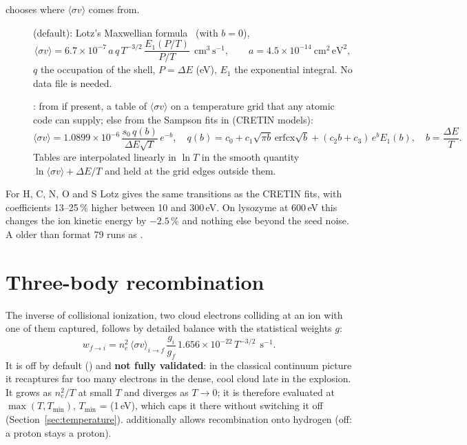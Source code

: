  chooses where $\langle\sigma v\rangle$ comes from.
\begin{description}
  \item[] (default): Lotz's Maxwellian formula~\cite{lotz1968} (with $b=0$),
    \begin{equation}
      \langle\sigma v\rangle = 6.7\times10^{-7}\,a\,q\,T^{-3/2}\,\frac{E_1(P/T)}{P/T}\ \ \mathrm{cm^3\,s^{-1}},\qquad
      a = 4.5\times10^{-14}\ \mathrm{cm^2\,eV^2},
    \end{equation}
    $q$ the occupation of the shell, $P = \Delta E$ (eV), $E_1$ the exponential integral.
    No data file is needed.
  \item[]: from  if present, a table of
    $\langle\sigma v\rangle$ on a temperature grid that any atomic code can supply; else from the Sampson fits in
     (CRETIN models):
    \begin{equation}
      \langle\sigma v\rangle = 1.0899\times10^{-6}\,\frac{s_0\,q(b)}{\Delta E\sqrt T}\,e^{-b},\quad
      q(b) = c_0 + c_1\sqrt{\pi b}\,\mathrm{erfcx}\sqrt b + (c_2b+c_3)\,e^bE_1(b),\quad b = \frac{\Delta E}{T}.
    \end{equation}
    Tables are interpolated linearly in $\ln T$ in the smooth quantity $\ln\langle\sigma v\rangle + \Delta E/T$ and
    held at the grid edges outside them.
\end{description}
For H, C, N, O and S Lotz gives the same transitions as the CRETIN fits, with coefficients 13--25\,\% higher
between 10 and 300\,eV.
On lysozyme at 600\,eV this changes the ion kinetic energy by $-2.5$\,\% and nothing else beyond the seed noise.
A  older than format 79 runs as .

\section{Three-body recombination}
\label{sec:recombination}

The inverse of collisional ionization, two cloud electrons colliding at an ion with one of them captured, follows by
detailed balance with the statistical weights $g$:
\begin{equation}
  w_{f\to i} = n_e^2\,\langle\sigma v\rangle_{i\to f}\,\frac{g_i}{g_f}\,1.656\times10^{-22}\,T^{-3/2}\ \ \mathrm{s^{-1}}.
\end{equation}
It is off by default () and \textbf{not fully validated}: in the classical
continuum picture it recaptures far too many electrons in the dense, cool cloud late in the explosion.
It grows as $n_e^2/T$ at small $T$ and diverges as $T\to0$; it is therefore evaluated at $\max(T, T_{\min})$,
$T_{\min}$ =  (1\,eV), which caps it there without switching it off (Section~\ref{sec:temperature}).
 additionally allows recombination onto hydrogen (off: a proton stays a proton).

